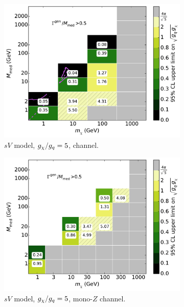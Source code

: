\begin{figure}
  \centering
  \begin{subfigure}[t]{0.32\textwidth}
    \centering
    \includegraphics[width=1.\textwidth]{figures/grid_basepoints_SVD_rat5_monojet.pdf}
    \caption{$sV$ model, $g_{\chi}/g_q = 5$, \monojet channel.}
  \end{subfigure}
  \begin{subfigure}[t]{0.32\textwidth}
    \centering
    \includegraphics[width=1.\textwidth]{figures/grid_allpoints_SVD_rat5.pdf}
    \caption{$sV$ model, $g_{\chi}/g_q = 5$, mono-$Z$ channel.}
  \end{subfigure}
  \begin{subfigure}[t]{0.32\textwidth}

\end{subfigure}
\end{figure}
